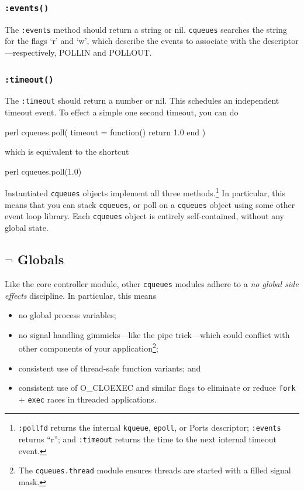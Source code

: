 \documentclass[11pt, oneside]{memoir}
\newcommand*{\cqueues}[0]{\texttt{cqueues}\xspace}
\newcommand*{\syscall}[1]{\texttt{#1}\xspace}
\newcommand*{\method}[1]{\texttt{#1}\xspace}
\newcommand*{\module}[1]{\texttt{#1}\xspace}
\begin{document}
\subsubsection[\method{object:events}]{\method{:events()}} The \method{:events} method should return a string or nil. \cqueues searches the string for the flags `r' and `w', which describe the events to associate with the descriptor---respectively, POLLIN and POLLOUT.

\subsubsection[\method{object:timeout}]{\method{:timeout()}} The \method{:timeout} should return a number or nil. This schedules an independent timeout event. To effect a simple one second timeout, you can do

\begin{code}{perl}
        cqueues.poll({ timeout = function() return 1.0 end })
\end{code}

which is equivalent to the shortcut

\begin{code}{perl}
	cqueues.poll(1.0)
\end{code}

Instantiated \cqueues objects implement all three methods.\footnote{\method{:pollfd} returns the internal \syscall{kqueue}, \syscall{epoll}, or Ports descriptor; \method{:events} returns ``r''; and \method{:timeout} returns the time to the next internal timeout event.} In particular, this means that you can stack \cqueues, or poll on a \cqueues object using some other event loop library. Each \cqueues object is entirely self-contained, without any global state.

\subsection{$\lnot$ Globals}

Like the core controller module, other \cqueues modules adhere to a \emph{no global side effects} discipline. In particular, this means
\begin{itemize}
\item no global process variables;
\item no signal handling gimmicks---like the pipe trick---which could conflict with other components of your application\footnote{The \module{cqueues.thread} module ensures threads are started with a filled signal mask.};
\item consistent use of thread-safe function variants; and
\item consistent use of O\_CLOEXEC and similar flags to eliminate or reduce \syscall{fork} $+$ \syscall{exec} races in threaded applications.
\end{itemize}
\end{document}
